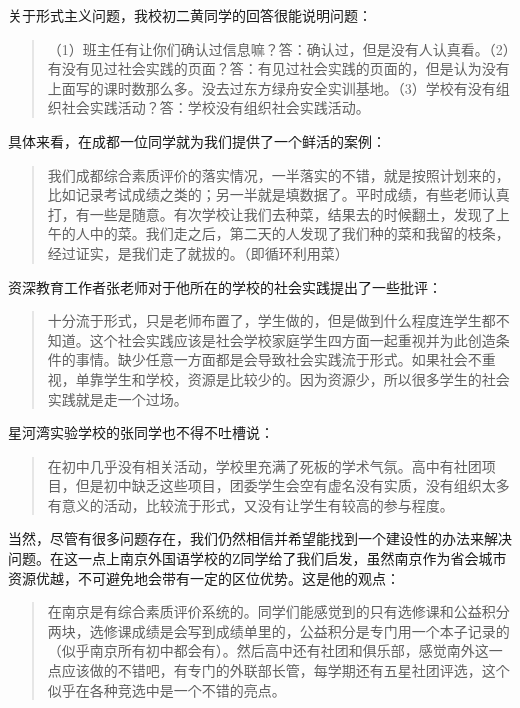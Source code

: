 \documentclass[12pt,UTF8]{ctexart}
\begin{document}
\par {
	关于形式主义问题，我校初二黄同学的回答很能说明问题：
	\begin{quote}
		\kaishu
		（1）班主任有让你们确认过信息嘛？答：确认过，但是没有人认真看。（2）有没有见过社会实践的页面？答：有见过社会实践的页面的，但是认为没有上面写的课时数那么多。没去过东方绿舟安全实训基地。（3）学校有没有组织社会实践活动？答：学校没有组织社会实践活动。
	\end{quote}
	具体来看，在成都一位同学就为我们提供了一个鲜活的案例：
	\begin{quote}
		\kaishu
		我们成都综合素质评价的落实情况，一半落实的不错，就是按照计划来的，比如记录考试成绩之类的；另一半就是填数据了。平时成绩，有些老师认真打，有一些是随意。有次学校让我们去种菜，结果去的时候翻土，发现了上午的人中的菜。我们走之后，第二天的人发现了我们种的菜和我留的枝条，经过证实，是我们走了就拔的。（即循环利用菜）
	\end{quote}
	资深教育工作者张老师对于他所在的学校的社会实践提出了一些批评：
	\begin{quote}
		\kaishu
		十分流于形式，只是老师布置了，学生做的，但是做到什么程度连学生都不知道。这个社会实践应该是社会学校家庭学生四方面一起重视并为此创造条件的事情。缺少任意一方面都是会导致社会实践流于形式。如果社会不重视，单靠学生和学校，资源是比较少的。因为资源少，所以很多学生的社会实践就是走一个过场。
	\end{quote}
	星河湾实验学校的张同学也不得不吐槽说：
	\begin{quote}
		\kaishu
		在初中几乎没有相关活动，学校里充满了死板的学术气氛。高中有社团项目，但是初中缺乏这些项目，团委学生会空有虚名没有实质，没有组织太多有意义的活动，比较流于形式，又没有让学生有较高的参与程度。
	\end{quote}
	
	当然，尽管有很多问题存在，我们仍然相信并希望能找到一个建设性的办法来解决问题。在这一点上南京外国语学校的Z同学给了我们启发，虽然南京作为省会城市资源优越，不可避免地会带有一定的区位优势。这是他的观点：
	\begin{quote}
		\kaishu
		在南京是有综合素质评价系统的。同学们能感觉到的只有选修课和公益积分两块，选修课成绩是会写到成绩单里的，公益积分是专门用一个本子记录的（似乎南京所有初中都会有）。然后高中还有社团和俱乐部，感觉南外这一点应该做的不错吧，有专门的外联部长管，每学期还有五星社团评选，这个似乎在各种竞选中是一个不错的亮点。
	\end{quote}
}
\end{document}
